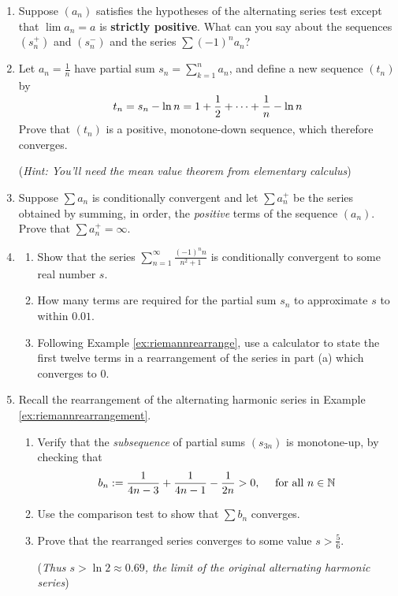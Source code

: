 \begin{exercises}{}{}
\begin{enumerate}
	  
	 \item Suppose $(a_n)$ satisfies the hypotheses of the alternating series test except that $\lim a_n=a$  is \textbf{strictly positive}. What can you say about the sequences $(s_n^+)$ and $(s_n^-)$ and the series $\sum (-1)^na_n$?
	  
	  
	 \item\label{exs:integralestimates}
	Let $a_n=\frac 1n$ have partial sum $s_n=\sum_{k=1}^na_n$, and define a new sequence $(t_n)$ by
	\[
		t_n=s_n-\ln n =\smash{1+\frac 12+\cdots +\frac 1n-\ln n}
	\]
	Prove that $(t_n)$ is a positive, monotone-down sequence, which therefore converges.\footnotemark{}\par
	(\emph{Hint: You'll need the mean value theorem from elementary calculus})
	
		
	\item Suppose $\sum a_n$ is conditionally convergent and let $\sum a_n^+$ be the series obtained by summing, in order, the \emph{positive} terms of the sequence $(a_n)$. Prove that $\sum a_n^+=\infty$.
	
		
	\item\begin{enumerate}
	  \item Show that the series $\sum_{n=1}^\infty \frac{(-1)^nn}{n^2+1}$ is conditionally convergent to some real number $s$.
	  \item How many terms are required for the partial sum $s_n$ to approximate $s$ to within $0.01$.
	  \item Following Example \ref{ex:riemannrearrange}, use a calculator to state the first twelve terms in a rearrangement of the series in part (a) which converges to 0. 
	\end{enumerate} 
		
		
	\item\label{exs:riemannrearrangement} Recall the rearrangement of the alternating harmonic series in Example \ref{ex:riemannrearrangement}.
	\begin{enumerate}
		\item Verify that the \emph{subsequence} of partial sums $(s_{3n})$ is monotone-up, by checking that
		\[
			b_n:=\frac 1{4n-3}+\frac 1{4n-1}-\frac 1{2n}>0,\quad\text{ for all $n\in\mathbb{N}$}
		\]
		\item Use the comparison test to show that $\sum b_n$ converges.
		\item Prove that the rearranged series converges to some value $s>\frac 56$.\par
		(\emph{Thus $s>\ln 2\approx 0.69$, the limit of the original alternating harmonic series})
		\end{enumerate}
			
	\end{enumerate}
\end{exercises}

\vspace{-15pt}


